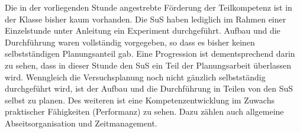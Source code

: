 Die in der vorliegenden Stunde angestrebte Förderung der Teilkompetenz ist in der Klasse bisher kaum vorhanden. Die SuS haben lediglich im Rahmen einer Einzelstunde unter Anleitung ein Experiment durchgeführt. Aufbau und die Durchführung waren vollständig vorgegeben, so dass es bisher keinen selbstständigen Planungsanteil gab. Eine Progression ist dementsprechend darin zu sehen, dass  in dieser Stunde  den SuS ein Teil der Planungsarbeit überlassen wird. Wenngleich die Versuchsplanung noch nicht gänzlich selbstständig durchgeführt wird, ist der Aufbau und die Durchführung in Teilen von den SuS selbst zu planen. Des weiteren ist eine Kompetenzentwicklung im Zuwachs praktischer Fähigkeiten (Performanz) zu sehen. Dazu zählen auch allgemeine Abseitsorganisation und Zeitmanagement.
%
